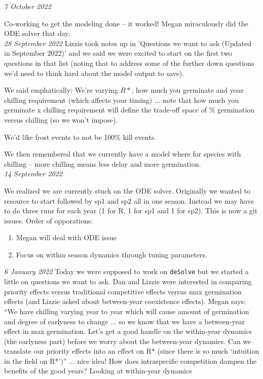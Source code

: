 \documentclass[11pt,letter]{article}
\begin{document}
\emph{7 October 2022}

Co-working to get the modeling done -- it worked! Megan miraculously did the ODE solver that day. \\

\emph{28 September 2022}
Lizzie took notes up in 'Questions we want to ask (Updated in September 2022)' and we said we were excited to start on the first two questions in that list (noting that to address some of the further down questions we'd need to think hard about the model output to save). 

We said emphatically: We're varying $R*$, how much you germinate and your chilling requirement (which affects your timing) ... note that how much you germinate x chilling requirement will define the trade-off space of \% germination versus chilling (so we won't impose). 

We'd like frost events to not be 100\% kill events. 

We then remembered that we currently have a model where  for species with chilling -- more chilling means less delay and more germination. \\

\emph{14 September 2022}

We realized we are currently stuck on the ODE solver. Originally we wanted to resource to start followed by sp1 and sp2 all in one season. Instead we may have to do three runs for each year (1 for R, 1 for sp1 and 1 for sp2). This is now a git issues. Order of opporations:
\begin{enumerate}
\item Megan will deal with ODE issue
\item Focus on within season dynamics through tuning parameters.
\end{enumerate}
\emph{6 January 2022} Today we were supposed to work on \verb|deSolve| but we started a little on questions we want to ask. Dan and Lizzie were interested in comparing priority effects versus traditional competitive effects versus max germination effects (and Lizzie asked about between-year coexistence effects). Megan says: ``We have chilling varying year to year which will cause amount of germination and degree of earlyness to change ... so we know that we have a between-year effect in max germination. Let's get a good handle on the within-year dynamics (the earlyness part) before we worry about the between-year dynamics. Can we translate our priority effects into an effect on R* (since there is so much `intuition in the field on R*')'' ... nice idea! How does intraspecific competition dampen the benefits of the good years? Looking at within-year dynamics \\
\end{document}
